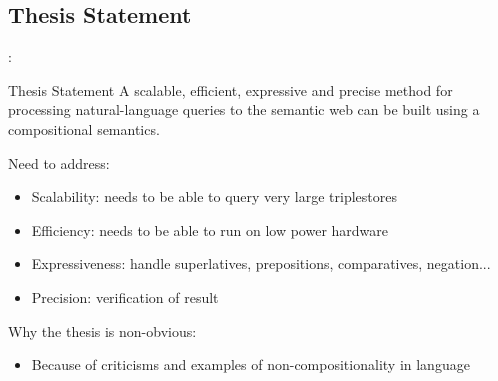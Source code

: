 \documentclass[logoontitle,tabu,supertabular,aspectratio=43]{preney-uwindsor-beamer}
\begin{document}
    \subsection{Thesis Statement}
    \begin{frame}{\insertsection: \insertsubsection}
        \begin{block}{Thesis Statement}
            A scalable, efficient, expressive and precise method for processing natural-language queries to the semantic web can be built using a compositional semantics.
        \end{block}

        Need to address:
        \begin{itemize}
            \item Scalability: needs to be able to query very large triplestores
            \item Efficiency: needs to be able to run on low power hardware
            \item Expressiveness: handle superlatives, prepositions, comparatives, negation...
            \item Precision: verification of result
        \end{itemize}

        Why the thesis is non-obvious:
        \begin{itemize}
            \item Because of criticisms and examples of non-compositionality in language
        \end{itemize}
    \end{frame}

\end{document}
